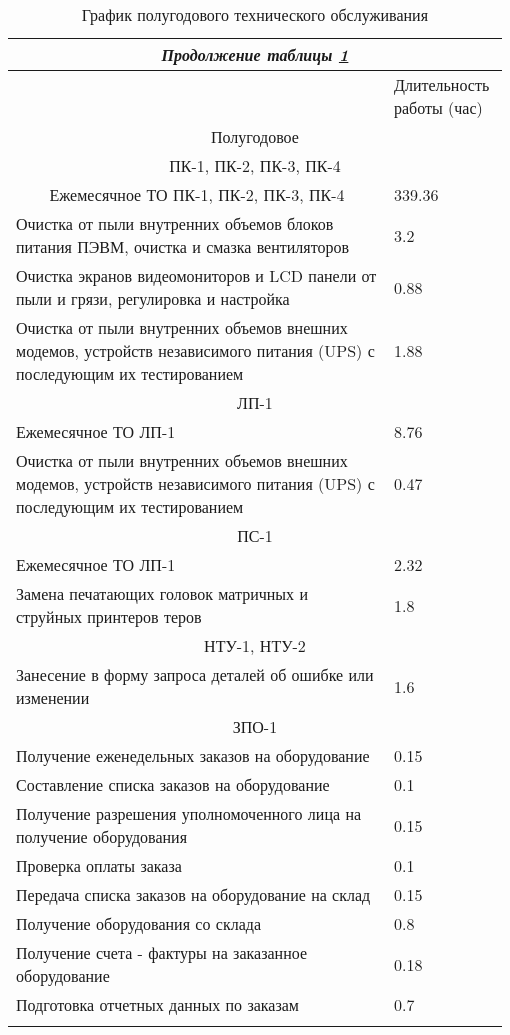 \documentclass[a4paper,14pt]{extarticle}
\begin{document}
\begin{longtable}{|p{0.75\linewidth}|m{0.23\linewidth}|}


\endfirsthead

\multicolumn{2}{c}{\textit{Продолжение таблицы \ref{tab:year}}}\\
\endhead

\hline
\endfoot


\endlastfoot
		\hline
		\multicolumn{1}{|c|}{Наименование работы} & Длительность работы (час) \\ \hline
		\multicolumn{ 2}{|c|}{Полугодовое} \\ \hline
		\multicolumn{ 2}{|c|}{ПК-1, ПК-2, ПК-3, ПК-4} \\ \hline
		\multicolumn{1}{|c|}{Ежемесячное ТО ПК-1, ПК-2, ПК-3, ПК-4} & 339.36 \\ \hline
		Очистка от пыли внутренних объемов 
		блоков питания ПЭВМ, очистка и 
		смазка вентиляторов  & 3.2 \\ \hline
		Очистка экранов видеомониторов и LCD 
		панели от пыли и грязи, регулировка 
		и настройка  & 0.88 \\ \hline
		Очистка от пыли внутренних объемов 
		внешних модемов, устройств 
		независимого питания (UPS) с 
		последующим их тестированием  & 1.88 \\ \hline
		\multicolumn{ 2}{|c|}{ЛП-1} \\ \hline
		Ежемесячное ТО ЛП-1 & 8.76 \\ \hline
		Очистка от пыли внутренних объемов внешних модемов, устройств независимого питания (UPS) с последующим их тестированием & 0.47 \\ \hline
		\multicolumn{ 2}{|c|}{ПС-1} \\ \hline
		Ежемесячное ТО ЛП-1 & 2.32 \\ \hline
		Замена печатающих головок матричных и струйных принтеров теров  & 1.8 \\ \hline
		\multicolumn{ 2}{|c|}{НТУ-1, НТУ-2} \\ \hline
		Занесение в форму запроса деталей об 
		ошибке или изменении   & 1.6 \\ \hline
		\multicolumn{ 2}{|c|}{ЗПО-1} \\ \hline
		Получение еженедельных заказов на 
		оборудование  & 0.15 \\ \hline
		Составление списка заказов на 
		оборудование  & 0.1 \\ \hline
		Получение разрешения уполномоченного 
		лица на получение оборудования  & 0.15 \\ \hline
		Проверка оплаты заказа  & 0.1 \\ \hline
		Передача списка заказов на 
		оборудование на склад  & 0.15 \\ \hline
		Получение оборудования со склада  & 0.8 \\ \hline
		Получение счета - фактуры на 
		заказанное оборудование  & 0.18 \\ \hline
		Подготовка отчетных данных по 
		заказам  & 0.7 \\ \hline
		\caption{График полугодового технического обслуживания}
		\label{tab:year}
	\end{longtable}
\end{document}

